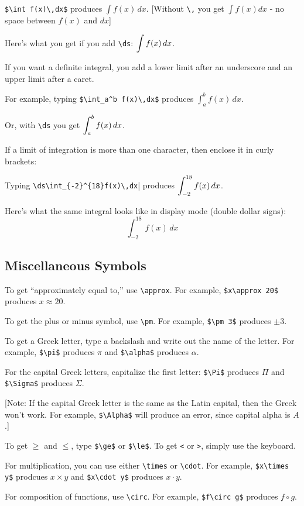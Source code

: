 \documentclass[12pt]{article}
\begin{document}
\verb|$\int f(x)\,dx$| produces $\int f(x)\,dx$. [Without \verb|\,| you get $\int f(x) dx$ - no space between $f(x)$ and $dx$]

Here's what you get if you add \verb|\ds|: $\displaystyle\int f(x)\,dx$.

If you want a definite integral, you add a lower limit after an underscore and an upper limit after a caret.

For example, typing \verb|$\int_a^b f(x)\,dx$| produces $\int_a^b f(x)\,dx$.

Or, with \verb|\ds| you get $\displaystyle\int_a^b f(x)\,dx$.

If a limit of integration is more than one character, then enclose it in curly brackets:

Typing \verb$\ds\int_{-2}^{18}f(x)\,dx$| produces $\displaystyle\int_{-2}^{18} f(x)\, dx$.

Here's what the same integral looks like in display mode (double dollar signs): $$\int_{-2}^{18} f(x)\, dx$$

\subsection{Miscellaneous Symbols}

To get ``approximately equal to,'' use \verb|\approx|. For example, \verb|$x\approx 20$| produces $x\approx20$.

To get the plus or minus symbol, use \verb|\pm|. For example, \verb|$\pm 3$| produces $\pm3$.

To get a Greek letter, type a backslash and write out the name of the letter. For example, \verb|$\pi$| produces $\pi$ and \verb|$\alpha$| produces $\alpha$.

For the capital Greek letters, capitalize the first letter: \verb|$\Pi$| produces $\Pi$ and \verb|$\Sigma$| produces $\Sigma$.

[Note: If the capital Greek letter is the same as the Latin capital, then the Greek won't work. For example, \verb|$\Alpha$| will produce an error, since capital alpha is $A$.]

To get $\ge$ and $\le$, type \verb|$\ge$| or \verb|$\le$|. To get \verb|<| or \verb|>|, simply use the keyboard.

For multiplication, you can use either \verb|\times| or \verb|\cdot|. For example, \verb|$x\times y$| prodcues $x\times y$ and \verb|$x\cdot y$| produces $x\cdot y$.

For composition of functions, use \verb|\circ|. For example, \verb|$f\circ g$| produces $f\circ g$.
\end{document}
